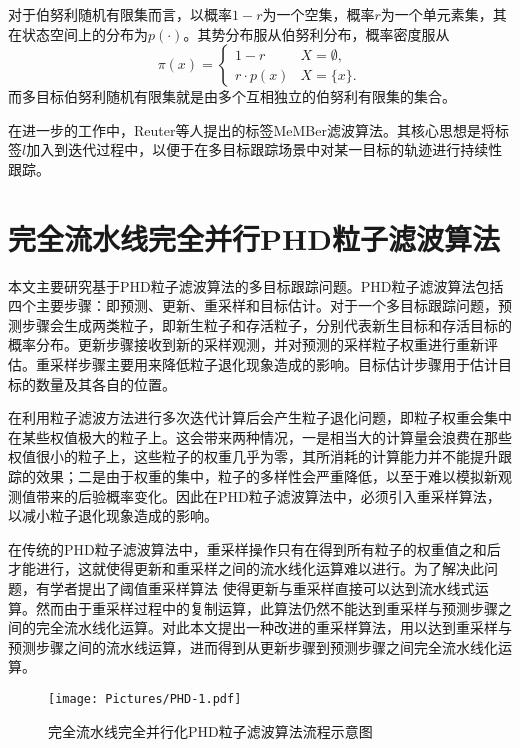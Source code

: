 对于伯努利随机有限集而言，以概率$1-r$为一个空集，概率$r$为一个单元素集，其在状态空间上的分布为$p(\cdot)$。其势分布服从伯努利分布，概率密度服从
\begin{equation}
   \pi(x) =  \left\{ \begin{array}{ll}
   1-r & X = \emptyset,\\
   r \cdot p(x) &X = \{x\}.
    \end{array}\right.
\end{equation}
而多目标伯努利随机有限集就是由多个互相独立的伯努利有限集的集合。

在进一步的工作中，Reuter等人提出的标签MeMBer滤波算法\cite{reuter2014labeled}。其核心思想是将标签$l$加入到迭代过程中，以便于在多目标跟踪场景中对某一目标的轨迹进行持续性跟踪\cite{vo2013labeled}。

\section{完全流水线完全并行PHD粒子滤波算法}

本文主要研究基于PHD粒子滤波算法的多目标跟踪问题。PHD粒子滤波算法包括四个主要步骤：即预测、更新、重采样和目标估计。对于一个多目标跟踪问题，预测步骤会生成两类粒子，即新生粒子和存活粒子，分别代表新生目标和存活目标的概率分布。更新步骤接收到新的采样观测，并对预测的采样粒子权重进行重新评估。重采样步骤主要用来降低粒子退化现象造成的影响。目标估计步骤用于估计目标的数量及其各自的位置。

在利用粒子滤波方法进行多次迭代计算后会产生粒子退化问题，即粒子权重会集中在某些权值极大的粒子上。这会带来两种情况，一是相当大的计算量会浪费在那些权值很小的粒子上，这些粒子的权重几乎为零，其所消耗的计算能力并不能提升跟踪的效果；二是由于权重的集中，粒子的多样性会严重降低，以至于难以模拟新观测值带来的后验概率变化。因此在PHD粒子滤波算法中，必须引入重采样算法，以减小粒子退化现象造成的影响。

在传统的PHD粒子滤波算法中，重采样操作只有在得到所有粒子的权重值之和后才能进行，这就使得更新和重采样之间的流水线化运算难以进行。为了解决此问题，有学者提出了阈值重采样算法 \cite{shi2013threshold}使得更新与重采样直接可以达到流水线式运算。然而由于重采样过程中的复制运算，此算法仍然不能达到重采样与预测步骤之间的完全流水线化运算。对此本文提出一种改进的重采样算法，用以达到重采样与预测步骤之间的流水线运算，进而得到从更新步骤到预测步骤之间完全流水线化运算。

\begin{figure}[htbp]
\centering
\texttt{[image: Pictures/PHD-1.pdf]}
\caption{完全流水线完全并行化PHD粒子滤波算法流程示意图}\label{PHD1}
\end{figure}


